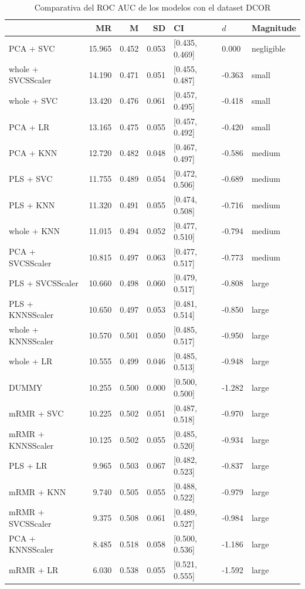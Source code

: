 \documentclass[a4paper,oneside,11pt,leqno]{article}
\begin{document}
	\begin{table}[h]
		\centering
		\begin{tabular}{lrrrlll}
			\toprule
			{} &     MR &     M &    SD &              CI &    $d$ &   Magnitude \\
			\midrule
			PCA + SVC          & 15.965 & 0.452 & 0.053 &  [0.435, 0.469] &  0.000 &  negligible \\
			whole + SVCSScaler & 14.190 & 0.471 & 0.051 &  [0.455, 0.487] & -0.363 &       small \\
			whole + SVC        & 13.420 & 0.476 & 0.061 &  [0.457, 0.495] & -0.418 &       small \\
			PCA + LR           & 13.165 & 0.475 & 0.055 &  [0.457, 0.492] & -0.420 &       small \\
			PCA + KNN          & 12.720 & 0.482 & 0.048 &  [0.467, 0.497] & -0.586 &      medium \\
			PLS + SVC          & 11.755 & 0.489 & 0.054 &  [0.472, 0.506] & -0.689 &      medium \\
			PLS + KNN          & 11.320 & 0.491 & 0.055 &  [0.474, 0.508] & -0.716 &      medium \\
			whole + KNN        & 11.015 & 0.494 & 0.052 &  [0.477, 0.510] & -0.794 &      medium \\
			PCA + SVCSScaler   & 10.815 & 0.497 & 0.063 &  [0.477, 0.517] & -0.773 &      medium \\
			PLS + SVCSScaler   & 10.660 & 0.498 & 0.060 &  [0.479, 0.517] & -0.808 &       large \\
			PLS + KNNSScaler   & 10.650 & 0.497 & 0.053 &  [0.481, 0.514] & -0.850 &       large \\
			whole + KNNSScaler & 10.570 & 0.501 & 0.050 &  [0.485, 0.517] & -0.950 &       large \\
			whole + LR         & 10.555 & 0.499 & 0.046 &  [0.485, 0.513] & -0.948 &       large \\
			DUMMY              & 10.255 & 0.500 & 0.000 &  [0.500, 0.500] & -1.282 &       large \\
			mRMR + SVC         & 10.225 & 0.502 & 0.051 &  [0.487, 0.518] & -0.970 &       large \\
			mRMR + KNNSScaler  & 10.125 & 0.502 & 0.055 &  [0.485, 0.520] & -0.934 &       large \\
			PLS + LR           &  9.965 & 0.503 & 0.067 &  [0.482, 0.523] & -0.837 &       large \\
			mRMR + KNN         &  9.740 & 0.505 & 0.055 &  [0.488, 0.522] & -0.979 &       large \\
			mRMR + SVCSScaler  &  9.375 & 0.508 & 0.061 &  [0.489, 0.527] & -0.984 &       large \\
			PCA + KNNSScaler   &  8.485 & 0.518 & 0.058 &  [0.500, 0.536] & -1.186 &       large \\
			mRMR + LR          &  6.030 & 0.538 & 0.055 &  [0.521, 0.555] & -1.592 &       large \\
			\bottomrule
		\end{tabular}
		\caption{Comparativa del ROC AUC de los modelos con el dataset DCOR}
		\label{tab:stat_results_dcor}
	\end{table}
\end{document}
